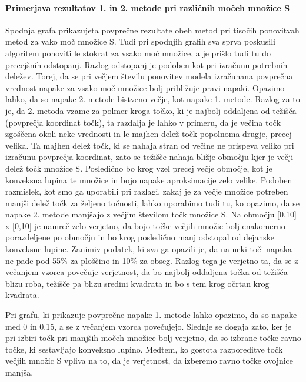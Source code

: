 \documentclass[
]{article}
\begin{document}
\hypertarget{primerjava-rezultatov-1.-in-2.-metode-pri-razliux10dnih-moux10deh-mnoux17eice-s}{%
\paragraph{Primerjava rezultatov 1. in 2. metode pri različnih močeh
množice
S}\label{primerjava-rezultatov-1.-in-2.-metode-pri-razliux10dnih-moux10deh-mnoux17eice-s}}

Spodnja grafa prikazujeta povprečne rezultate obeh metod pri tisočih
ponovitvah metod za vako moč množice S. Tudi pri spodnjih grafih sva
sprva poskusili algoritem ponoviti le stokrat za vsako moč množice, a je
prišlo tudi tu do precejšnih odstopanj. Razlog odstopanj je podoben kot
pri izračunu potrebnih deležev. Torej, da se pri večjem številu
ponovitev modela izračunana povprečna vrednost napake za vsako moč
množice bolj približuje pravi napaki. Opazimo lahko, da so napake 2.
metode bistveno večje, kot napake 1. metode. Razlog za to je, da 2.
metoda vzame za polmer kroga točko, ki je najbolj oddaljena od težišča
(povprečja koordinat točk), ta razdalja je lahko v primeru, da je večina
točk zgoščena okoli neke vrednosti in le majhen delež točk popolnoma
drugje, precej velika. Ta majhen delež točk, ki se nahaja stran od
večine ne prispeva veliko pri izračunu povprečja koordinat, zato se
težišče nahaja bližje območju kjer je večji delež točk množice S.
Posledično bo krog vzel precej večje območje, kot je konveksna lupina te
množice in bojo napake aproksimacije zelo velike. Podoben razmislek, kot
smo ga uporabili pri razlagi, zakaj je za večje množice potreben manjši
delež točk za željeno točnosti, lahko uporabimo tudi tu, ko opazimo, da
se napake 2. metode manjšajo z večjim številom točk množice S. Na
območju {[}0,10{]} x {[}0,10{]} je namreč zelo verjetno, da bojo točke
večjih množic bolj enakomerno porazdeljene po območju in bo krog
posledično manj odstopal od dejanske konveksne lupine. Zanimiv podatek,
ki sva ga opazili je, da na neki toči napaka ne pade pod 55\% za
ploščino in 10\% za obseg. Razlog tega je verjetno ta, da se z večanjem
vzorca povečuje verjetnost, da bo najbolj oddaljena točka od težišča
blizu roba, težišče pa blizu sredini kvadrata in bo s tem krog očrtan
krog kvadrata.

\newline Pri grafu, ki prikazuje povprečne napake 1. metode lahko
opazimo, da so napake med 0 in 0.15, a se z večanjem vzorca povečujejo.
Slednje se dogaja zato, ker je pri izbiri točk pri manjših močeh množice
bolj verjetno, da so izbrane točke ravno točke, ki sestavljajo konveksno
lupino. Medtem, ko gostota razporeditve točk večjih množic S vpliva na
to, da je verjetnost, da izberemo ravno točke ovojnice manjša.
\end{document}
